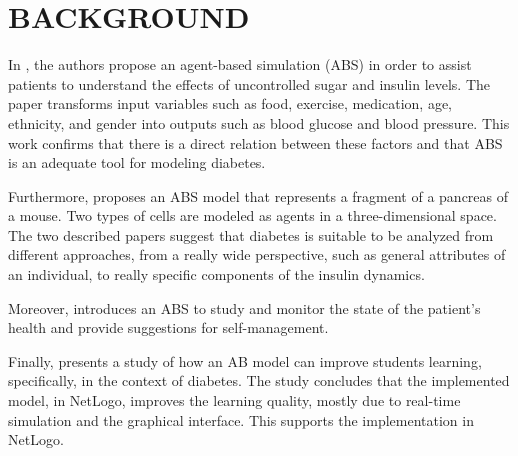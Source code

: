\section{BACKGROUND}
In \cite{nejad2008agent}, the authors propose an agent-based simulation (ABS) in order to assist patients to understand the effects of uncontrolled sugar and insulin levels. The paper transforms input variables such as food, exercise, medication, age, ethnicity, and gender into outputs such as blood glucose and blood pressure. This work confirms that there is a direct relation between these factors and that ABS is an adequate tool for modeling diabetes.

Furthermore, \cite{martinez2012definition} proposes an ABS model that represents a fragment of a pancreas of a mouse. Two types of cells are modeled as agents in a three-dimensional space. The two described papers suggest that diabetes is suitable to be analyzed from different approaches, from a really wide perspective, such as general attributes of an individual, to really specific components of the insulin dynamics.

Moreover, \cite{montagna2017agent} introduces an ABS to study and monitor the state of the patient's health and provide suggestions for self-management. 

Finally, \cite{dubovi2019instructional} presents a study of how an AB model can improve students learning, specifically, in the context of diabetes. The study concludes that the implemented model, in NetLogo, improves the learning quality, mostly due to real-time simulation and the graphical interface. This supports the implementation in NetLogo.